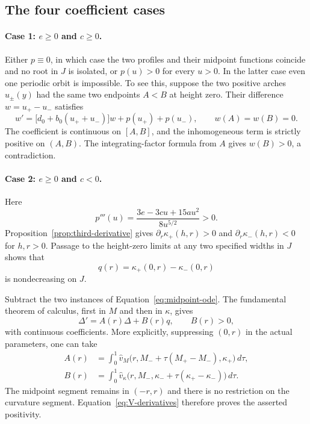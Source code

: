 \subsection{The four coefficient cases}

\paragraph{Case 1: $e\ge0$ and $c\ge0$.}
Either $p\equiv0$, in which case the two profiles and their midpoint
functions coincide and no root in $J$ is isolated, or $p(u)>0$ for
every $u>0$. In the latter case even one periodic orbit is
impossible. To see this, suppose the two positive arches
$u_\pm(y)$ had the same two endpoints $A<B$ at height zero.
Their difference $w=u_+-u_-$ satisfies
\[
 w'=\bigl[d_0+b_0(u_++u_-)\bigr]w
       +p(u_+)+p(u_-),\qquad w(A)=w(B)=0.
\]
The coefficient is continuous on $[A,B]$, and the inhomogeneous
term is strictly positive on $(A,B)$. The integrating-factor
formula from $A$ gives $w(B)>0$, a contradiction.

\paragraph{Case 2: $e\ge0$ and $c<0$.}
Here
\begin{equation}\label{eq:third-odd}
 p'''(u)=\frac{3e-3cu+15au^2}{8u^{5/2}}>0.
\end{equation}
Proposition~\ref{prop:third-derivative} gives
$\partial_r\kappa_+(h,r)>0$ and
$\partial_r\kappa_-(h,r)<0$ for $h,r>0$. Passage to the
height-zero limits at any two specified widths in $J$ shows that
\[
 q(r)=\kappa_+(0,r)-\kappa_-(0,r)
\]
is nondecreasing on $J$.

Subtract the two instances of Equation~\eqref{eq:midpoint-ode}.
The fundamental theorem
of calculus, first in $M$ and then in $\kappa$, gives
\begin{equation}\label{eq:Delta-transport}
 \Delta'=A(r)\Delta+B(r)q,\qquad B(r)>0,
\end{equation}
with continuous coefficients. More explicitly, suppressing
$(0,r)$ in the actual parameters, one can take
\[
 \begin{split}
 A(r)&=\int_0^1
 \widehat v_M\bigl(r,M_-+\tau(M_+-M_-),\kappa_+\bigr)\,d\tau,\\
 B(r)&=\int_0^1
 \widehat v_\kappa\bigl(r,M_-,\kappa_-+\tau(\kappa_+-\kappa_-)\bigr)\,d\tau.
 \end{split}
\]
The midpoint segment remains in $(-r,r)$ and there is no
restriction on the curvature segment. Equation~\eqref{eq:V-derivatives}
therefore proves the asserted positivity.

